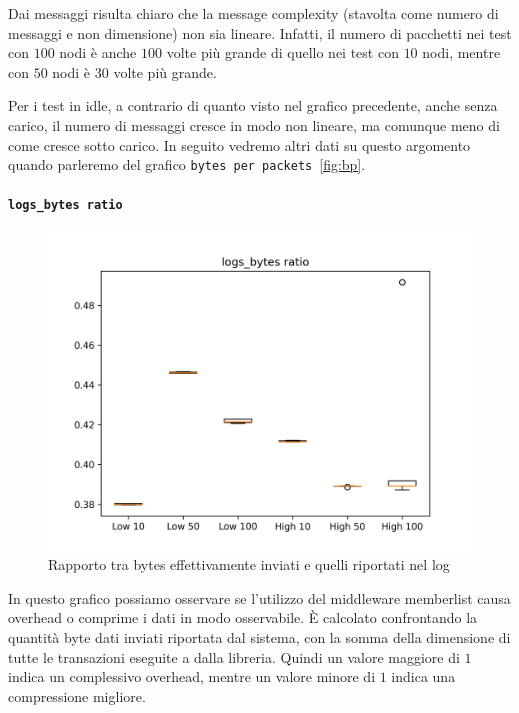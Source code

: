 \documentclass[12pt, a4paper]{article}
\begin{document}
Dai messaggi risulta chiaro che la message complexity (stavolta come numero di messaggi e non dimensione) non sia lineare. Infatti, il numero di pacchetti nei test con $100$ nodi è anche $100$ volte più grande di quello nei test con $10$ nodi, mentre con $50$ nodi è $30$ volte più grande.

Per i test in idle, a contrario di quanto visto nel grafico precedente, anche senza carico, il numero di messaggi cresce in modo non lineare, ma comunque meno di come cresce sotto carico. In seguito vedremo altri dati su questo argomento quando parleremo del grafico \lstinline{bytes per packets}~\ref{fig:bp}.

\paragraph{\lstinline{logs_bytes ratio}}

\begin{figure}[H]
    \includegraphics[width=\linewidth, keepaspectratio]{graphs/logs_bytes ratio.png}
    \caption{Rapporto tra bytes effettivamente inviati e quelli riportati nel log}
    \label{fig:lbr}
\end{figure}

In questo grafico possiamo osservare se l'utilizzo del middleware memberlist causa overhead o comprime i dati in modo osservabile.
È calcolato confrontando la quantità byte dati inviati riportata dal sistema, con la somma della dimensione di tutte le transazioni eseguite a dalla libreria. Quindi un valore maggiore di $1$ indica un complessivo overhead, mentre un valore minore di $1$ indica una compressione migliore.
\end{document}
